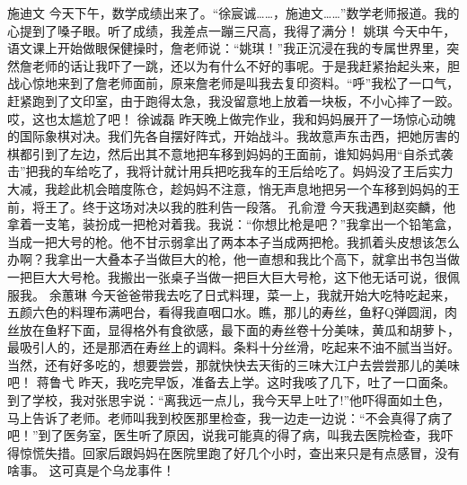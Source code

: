 {}\markdownRendererInterblockSeparator
{}施迪文\markdownRendererInterblockSeparator
{}今天下午，数学成绩出来了。“徐宸诚……，施迪文……”数学老师报道。我的心提到了嗓子眼。听了成绩，我差点一蹦三尺高，我得了满分！\markdownRendererInterblockSeparator
{}\markdownRendererInterblockSeparator
{}姚琪\markdownRendererInterblockSeparator
{}今天中午，语文课上开始做眼保健操时，詹老师说：“姚琪！”我正沉浸在我的专属世界里，突然詹老师的话让我吓了一跳，还以为有什么不好的事呢。于是我赶紧抬起头来，胆战心惊地来到了詹老师面前，原来詹老师是叫我去复印资料。“呼”我松了一口气，赶紧跑到了文印室，由于跑得太急，我没留意地上放着一块板，不小心摔了一跤。哎，这也太尴尬了吧！\markdownRendererInterblockSeparator
{}\markdownRendererInterblockSeparator
{}徐诚磊\markdownRendererInterblockSeparator
{}昨天晚上做完作业，我和妈妈展开了一场惊心动魄的国际象棋对决。我们先各自摆好阵式，开始战斗。我故意声东击西，把她厉害的棋都引到了左边，然后出其不意地把车移到妈妈的王面前，谁知妈妈用“自杀式袭击”把我的车给吃了，我将计就计用兵把吃我车的王后给吃了。妈妈没了王后实力大减，我趁此机会暗度陈仓，趁妈妈不注意，悄无声息地把另一个车移到妈妈的王前，将王了。终于这场对决以我的胜利告一段落。\markdownRendererInterblockSeparator
{}\markdownRendererInterblockSeparator
{}孔俞澄\markdownRendererInterblockSeparator
{}今天我遇到赵奕麟，他拿着一支笔，装扮成一把枪对着我。我说：“你想比枪是吧？”我拿出一个铅笔盒，当成一把大号的枪。他不甘示弱拿出了两本本子当成两把枪。我抓着头皮想该怎么办啊？我拿出一大叠本子当做巨大的枪，他一直想和我比个高下，就拿出书包当做一把巨大大号枪。我搬出一张桌子当做一把巨大巨大号枪，这下他无话可说，很佩服我。\markdownRendererInterblockSeparator
{}\markdownRendererInterblockSeparator
{}余蕙琳\markdownRendererInterblockSeparator
{}今天爸爸带我去吃了日式料理，菜一上，我就开始大吃特吃起来，五颜六色的料理布满吧台，看得我直咽口水。瞧，那儿的寿丝，鱼籽Q弹圆润，肉丝放在鱼籽下面，显得格外有食欲感，最下面的寿丝卷十分美味，黄瓜和胡萝卜，最吸引人的，还是那洒在寿丝上的调料。条料十分丝滑，吃起来不油不腻当当好。当然，还有好多吃的，想要尝尝，那就快快去天街的三味大江户去尝尝那儿的美味吧！\markdownRendererInterblockSeparator
{}\markdownRendererInterblockSeparator
{}蒋鲁弋\markdownRendererInterblockSeparator
{}昨天，我吃完早饭，准备去上学。这时我咳了几下，吐了一口面条。到了学校，我对张思宇说：“离我远一点儿，我今天早上吐了!”他吓得面如土色，马上告诉了老师。老师叫我到校医那里检查，我一边走一边说：“不会真得了病了吧！”到了医务室，医生听了原因，说我可能真的得了病，叫我去医院检查，我吓得惊慌失措。回家后跟妈妈在医院里跑了好几个小时，查出来只是有点感冒，没有啥事。 这可真是个乌龙事件！\markdownRendererInterblockSeparator
